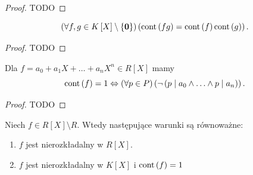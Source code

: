 \begin{proof}
	TODO
\end{proof} 
\begin{lemma}[Guassa]
	\[
	\left(\forall f,g \in K\left[ X \right] \setminus \{\mathbf{0}\}  \right)\left( \operatorname{cont} \left( fg \right) = \operatorname{cont} \left( f \right) \operatorname{cont} \left( g \right)  \right)  
	.\] 
\end{lemma} 
\begin{proof}
	TODO
\end{proof} 
\begin{lemma}
	
	Dla $f = a_0 + a_1X + \ldots + a_{n} X^{n} \in R\left[ X \right] $ mamy
	\[
	\operatorname{cont} \left( f \right) = 1 \Leftrightarrow \left(\forall p\in P \right)\left( \neg \left( p\mid a_0 \land\ldots\land p\mid a_{n}  \right)  \right)  
	.\] 
\end{lemma} 
\begin{proof}
	TODO
\end{proof} 
\begin{corollary}[Wniosek]
      Niech $f\in R\left[ X \right] \setminus R$. Wtedy następujące warunki są równoważne:
      \begin{enumerate}[label=\arabic*)]
      	\item $f$ jest nierozkładalny w $R\left[ X \right] $.
	\item $f$ jest nierozkładalny w $K\left[ X \right] $ i $\operatorname{cont} \left( f \right) = 1$
      \end{enumerate}
\end{corollary}
